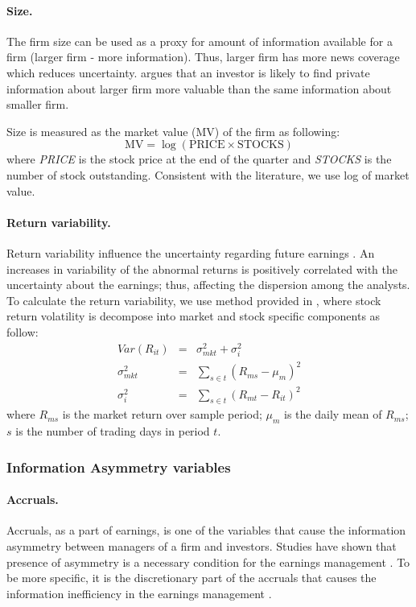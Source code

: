 \paragraph{Size.} The firm size can be used as a proxy for amount of information available for a firm (larger firm - more information). Thus, larger firm has more news coverage which reduces uncertainty. \cite{bhushan1989} argues that an investor is likely to find private information about larger firm more valuable than the same information about smaller firm. 

Size is measured as the market value (MV) of the firm as following:
\begin{equation}
\mathrm{MV}= \log(\mathrm{PRICE} \times \mathrm{STOCKS})
\end{equation}
where \emph{PRICE}  is the stock price at the end of the quarter and \emph{STOCKS} is the number of stock outstanding. Consistent with the literature, we use log of market value. 


\paragraph{Return variability.}
Return variability influence the uncertainty regarding future earnings \citep{henley2003, diether2002}. An increases in variability of the abnormal returns is positively correlated with the uncertainty about the earnings; thus, affecting the dispersion among the analysts. To calculate the return variability, we use method provided in \cite{sousa2008}, where stock return volatility is decompose into market and stock specific components as follow:
\begin{eqnarray}
Var (R_{it})&=&\sigma^2_{mkt}+\sigma^2_{i} \\
\sigma^2_{mkt}&=&\sum_{s\in t} (R_{ms}-\mu_{m})^2 \nonumber \\ 
\sigma^2_{i}&=&\sum_{s \in t} (R_{mt}-R_{it})^2 \nonumber
\end{eqnarray}
where $R_{ms}$ is the market return over sample period; $\mu_{m}$ is the daily mean of $R_{ms}$; $s$ is the number of trading days in period $t$.

\subsubsection{Information Asymmetry variables}

\paragraph{Accruals.} 
Accruals, as a part of  earnings, is one of the variables that cause the information asymmetry between managers of a firm and investors. Studies have shown that presence of asymmetry is a necessary condition for the earnings management \citep{trueman1988,richardson2000}. To be more specific, it is the discretionary part of the accruals that causes  the information inefficiency  in the earnings management \citep{richardson2000,ahmed2005}. 

